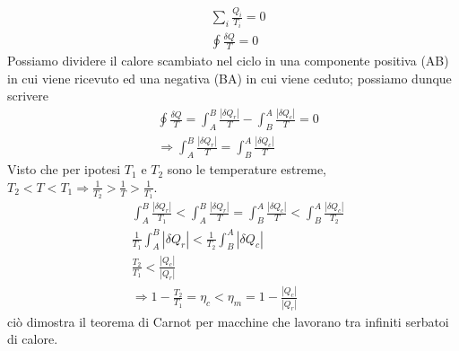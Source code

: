 \documentclass[10pt,a4paper]{article}
\begin{document}
\begin{align*}
	&\sum_i \frac{Q_i}{T_i} = 0\\
	&\oint \frac{\delta Q}{T} = 0
\end{align*}
Possiamo dividere il calore scambiato nel ciclo in una componente positiva (AB) in cui viene ricevuto ed una negativa (BA) in cui viene ceduto; possiamo dunque scrivere
\begin{align*}
	&\oint \frac{\delta Q}{T} = \int_A^B \frac{|\delta Q_r|}{T}- \int_B^A \frac{|\delta Q_c|}{T}= 0\\
	&\Rightarrow \int_A^B \frac{|\delta Q_r|}{T} = \int_B^A \frac{|\delta Q_c|}{T}
\end{align*}
Visto che per ipotesi \(T_1\) e \(T_2\) sono le temperature estreme, \(T_2<T<T_1 \Rightarrow \frac{1}{T_2}>\frac{1}{T}>\frac{1}{T_1}\).
\begin{align*}
	&\int_A^B \frac{|\delta Q_r|}{T_1} < \int_A^B \frac{|\delta Q_r|}{T} = \int_B^A \frac{|\delta Q_c|}{T} < \int_B^A \frac{|\delta Q_c|}{T_2}\\
	&\frac{1}{T_1} \int_A^B |\delta Q_r| < \frac{1}{T_2} \int_B^A |\delta Q_c|\\
	&\frac{T_2}{T_1} < \frac{|Q_c|}{|Q_r|}\\
	&\Rightarrow 1-\frac{T_2}{T_1} = \eta_c < \eta_m = 1-\frac{|Q_c|}{|Q_r|}
\end{align*} 
ciò dimostra il teorema di Carnot per macchine che lavorano tra infiniti serbatoi di calore. 
\end{document}
